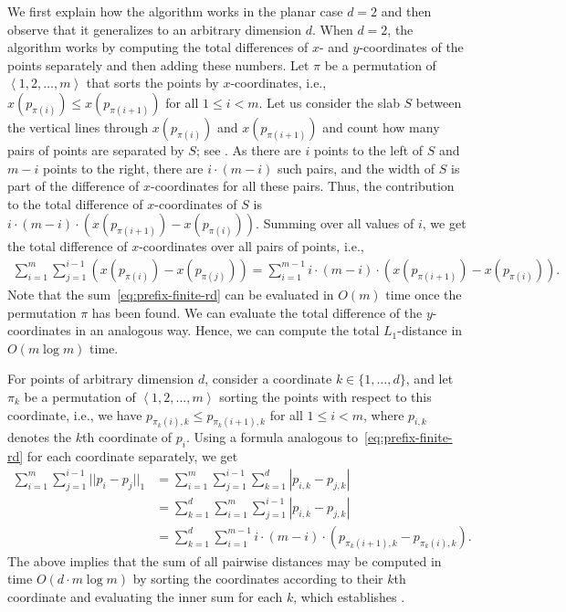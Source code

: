 \documentclass{article}
\begin{document}
We first explain how the algorithm works in the planar case $d=2$ and then observe that it generalizes to an arbitrary dimension $d$.
When $d=2$, the algorithm works by computing the total differences of $x$- and $y$-coordinates of the points separately and then adding these numbers.
Let $\pi$ be a permutation of $\left\langle 1, 2, \ldots, m \right\rangle$ that sorts the points by $x$-coordinates, i.e., $x(p_{\pi(i)})\leq x(p_{\pi(i+1)})$ for all $1\leq i < m$. 
Let us consider the slab $S$ between the vertical lines through $x(p_{\pi(i)})$ and $x(p_{\pi(i+1)})$ and count how many pairs of points are separated by $S$; see .
As there are $i$ points to the left of $S$ and $m-i$ points to the right, there are $i\cdot (m-i)$ such pairs, and the width of $S$ is part of the difference of $x$-coordinates for all these pairs.
Thus, the contribution to the total difference of $x$-coordinates of $S$ is $i\cdot (m-i) \cdot (x(p_{\pi(i+1)})-x(p_{\pi(i)}))$.
Summing over all values of $i$, we get the total difference of $x$-coordinates over all pairs of points, i.e.,
\begin{align}
\sum_{i=1}^m \sum_{j=1}^{i-1} (x(p_{\pi(i)})-x(p_{\pi(j)})) =\sum_{i=1}^{m-1} i\cdot (m-i) \cdot (x(p_{\pi(i+1)})-x(p_{\pi(i)})). \label{eq:prefix-finite-rd}
\end{align}
Note that the sum~\eqref{eq:prefix-finite-rd} can be evaluated in $O(m)$ time once the permutation $\pi$ has been found.
We can evaluate the total difference of the $y$-coordinates in an analogous way.
Hence, we can compute the total $L_1$-distance in $O(m\log m)$ time.

For points of arbitrary dimension $d$, consider a coordinate $k\in\{1,\ldots,d\}$, and let $\pi_k$ be a permutation of $\left\langle 1, 2, \ldots, m \right\rangle$ sorting the points with respect to this coordinate, i.e., we have $p_{\pi_k(i),k}\leq p_{\pi_k(i+1),k}$ for all $1\leq i < m$, where $p_{i,k}$ denotes the $k$th coordinate of $p_i$.
Using a formula analogous to~\eqref{eq:prefix-finite-rd} for each coordinate separately, we get
\begin{align}
\sum_{i=1}^m \sum_{j=1}^{i-1} ||p_i-p_j||_1 &= \sum_{i=1}^m \sum_{j=1}^{i-1} \sum_{k=1}^d |p_{i,k}-p_{j,k}| \nonumber \\
&= \sum_{k=1}^d \sum_{i=1}^m \sum_{j=1}^{i-1} |p_{i,k}-p_{j,k}| \nonumber \\
&= \sum_{k=1}^d \sum_{i=1}^{m-1} i\cdot (m-i) \cdot (p_{\pi_k(i+1),k}-p_{\pi_k(i),k}). \nonumber 
\end{align}
The above implies that the sum of all pairwise distances may be computed in time $O(d \cdot m \log m)$ by sorting the coordinates according to their $k$th coordinate and evaluating the inner sum for each $k$, which establishes .
\end{document}
